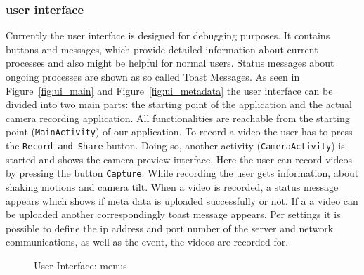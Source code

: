 \documentclass[conference]{IEEEtran}
\begin{document}
\subsubsection{user interface}

Currently the user interface is designed for debugging purposes.
It contains buttons and messages, which provide detailed information about current processes and also might be helpful for normal users.
Status messages about ongoing processes are shown as so called Toast Messages. 
As seen in Figure~\ref{fig:ui_main} and Figure~\ref{fig:ui_metadata} the user interface can be divided into two main parts: the starting point of the application and the actual camera recording application.
All functionalities are reachable from the starting point (\texttt{MainActivity}) of our application. To record a video the user has to press the \texttt{Record and Share} button.
Doing so, another activity (\texttt{CameraActivity}) is started and shows the camera preview interface. Here the user can record videos by pressing the button \texttt{Capture}. While recording the user gets information, about shaking motions and camera tilt. When a video is recorded, a status message appears which shows if meta data is uploaded successfully or not. If a a video can be uploaded another correspondingly toast message appears.
Per settings it is possible to define the ip address and port number of the server and network communications, as well as the event, the videos are recorded for.

\begin{figure}[!t]
	\centering
	\hfil
	\caption{User Interface: menus}
	\label{fig:ui_menu}
\end{figure}
\end{document}
